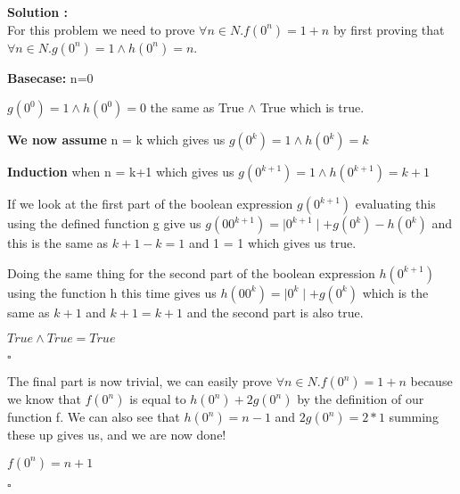 \documentclass{article}
\newcounter{problem}
\newcounter{solution}
\newcommand\ASolution{%
  \stepcounter{solution}%
  \textbf{Solution \thesolution:}\\%
}
\begin{document}
\ASolution
For this problem we need to prove $\forall n \in N. f(0^n) = 1+n$ by first proving that $\forall n \in N. g(0^n) = 1 \wedge h(0^n) = n$.

\textbf{Basecase:} n=0

$g(0^0) = 1 \wedge h(0^0) = 0$ the same as True $\wedge$ True which is true.

\textbf{We now assume} n = k which gives us $g(0^k) = 1 \wedge h(0^k) = k$

\textbf{Induction} when n = k+1 which gives us $g(0^{k+1}) = 1 \wedge h(0^{k+1}) = k+1$

If we look at the first part of the boolean expression $g(0^{k+1})$ evaluating this using the defined function g give us $g(00^{k+1}) = \mid 0^{k+1} \mid + g(0^k) - h(0^k)$ and this is the same as $k + 1 - k = 1$ and 1 = 1 which gives us true.

Doing the same thing for the second part of the boolean expression $h(0^{k+1})$ using the function h this time gives us $h(00^k) = \mid 0^k \mid + g(0^k)$ which is the same as $k + 1$ and $k+1 = k+1$ and the second part is also true.

$True \wedge True = True$ 

 \hfill 
 $\square$
 \newpage
 
 The final part is now trivial, we can easily prove $\forall n \in N. f(0^n) = 1+n$ because we know that $f(0^n)$ is equal to $h(0^n) + 2g(0^n)$ by the definition of our function f. We can also see that $h(0^n) = n-1$ and $2g(0^n) = 2*1$ summing these up gives us, and we are now done!
 \begin{center}
     $f(0^n) = n+1$
 \end{center}
\hfill
$\square$
\end{document}
